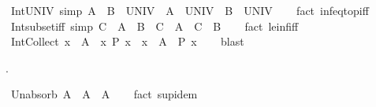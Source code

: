 \begin{isabellebody}
\ Int{\isacharunderscore}{\kern0pt}UNIV\ {\isacharbrackleft}{\kern0pt}simp{\isacharbrackright}{\kern0pt}{\isacharcolon}{\kern0pt}\ {\isachardoublequoteopen}A\ {\isasyminter}\ B\ {\isacharequal}{\kern0pt}\ UNIV\ {\isasymlongleftrightarrow}\ A\ {\isacharequal}{\kern0pt}\ UNIV\ {\isasymand}\ B\ {\isacharequal}{\kern0pt}\ UNIV{\isachardoublequoteclose}\isanewline
%
\isadelimproof
\ \ %
\endisadelimproof
%
\isatagproof
{}\isamarkupfalse%
\ {\isacharparenleft}{\kern0pt}fact\ inf{\isacharunderscore}{\kern0pt}eq{\isacharunderscore}{\kern0pt}top{\isacharunderscore}{\kern0pt}iff{\isacharparenright}{\kern0pt}%
\endisatagproof
{\isafoldproof}%
%
\isadelimproof
%
\endisadelimproof
\ \isanewline
\isanewline
{}\isamarkupfalse%
\ Int{\isacharunderscore}{\kern0pt}subset{\isacharunderscore}{\kern0pt}iff\ {\isacharbrackleft}{\kern0pt}simp{\isacharbrackright}{\kern0pt}{\isacharcolon}{\kern0pt}\ {\isachardoublequoteopen}C\ {\isasymsubseteq}\ A\ {\isasyminter}\ B\ {\isasymlongleftrightarrow}\ C\ {\isasymsubseteq}\ A\ {\isasymand}\ C\ {\isasymsubseteq}\ B{\isachardoublequoteclose}\isanewline
%
\isadelimproof
\ \ %
\endisadelimproof
%
\isatagproof
{}\isamarkupfalse%
\ {\isacharparenleft}{\kern0pt}fact\ le{\isacharunderscore}{\kern0pt}inf{\isacharunderscore}{\kern0pt}iff{\isacharparenright}{\kern0pt}%
\endisatagproof
{\isafoldproof}%
%
\isadelimproof
\isanewline
%
\endisadelimproof
\isanewline
{}\isamarkupfalse%
\ Int{\isacharunderscore}{\kern0pt}Collect{\isacharcolon}{\kern0pt}\ {\isachardoublequoteopen}x\ {\isasymin}\ A\ {\isasyminter}\ {\isacharbraceleft}{\kern0pt}x{\isachardot}{\kern0pt}\ P\ x{\isacharbraceright}{\kern0pt}\ {\isasymlongleftrightarrow}\ x\ {\isasymin}\ A\ {\isasymand}\ P\ x{\isachardoublequoteclose}\isanewline
%
\isadelimproof
\ \ %
\endisadelimproof
%
\isatagproof
{}\isamarkupfalse%
\ blast%
\endisatagproof
{\isafoldproof}%
%
\isadelimproof
%
\endisadelimproof
%
\begin{isamarkuptext}%
\medskip {}.%
\end{isamarkuptext}\isamarkuptrue%
\isamarkupfalse%
\ Un{\isacharunderscore}{\kern0pt}absorb{\isacharcolon}{\kern0pt}\ {\isachardoublequoteopen}A\ {\isasymunion}\ A\ {\isacharequal}{\kern0pt}\ A{\isachardoublequoteclose}\isanewline
%
\isadelimproof
\ \ %
\endisadelimproof
%
\isatagproof
{}\isamarkupfalse%
\ {\isacharparenleft}{\kern0pt}fact\ sup{\isacharunderscore}{\kern0pt}idem{\isacharparenright}{\kern0pt}%
\endisatagproof
{\isafoldproof}%
%
\isadelimproof
%
\endisadelimproof
\ \isanewline

\end{isabellebody}
